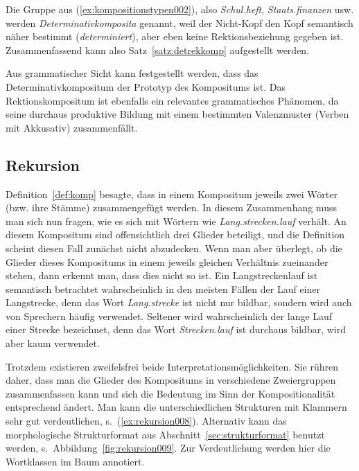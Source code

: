 Die Gruppe aus (\ref{ex:kompositionstypen002}), also \textit{Schul.heft}, \textit{Staats.finanzen} usw. werden \textit{Determinativkomposita} genannt, weil der Nicht-Kopf den Kopf semantisch näher bestimmt (\textit{determiniert}), aber eben keine Rektionsbeziehung gegeben ist.
Zusammenfassend kann also Satz~\ref{satz:detrekkomp} aufgestellt werden.


Aus grammatischer Sicht kann festgestellt werden, dass das Determinativkompositum der Prototyp des Kompositums ist.
Das Rektionskompositum ist ebenfalls ein relevantes grammatisches Phänomen, da seine durchaus produktive Bildung mit einem bestimmten Valenzmuster (Verben mit Akkusativ) zusammenfällt.

\subsection{Rekursion}
\label{sec:rekursion}


Definition~\ref{def:komp} besagte, dass in einem Kompositum jeweils zwei Wörter (bzw. ihre Stämme) zusammengefügt werden.
In diesem Zusammenhang muss man sich nun fragen, wie es sich mit Wörtern wie \textit{Lang.strecken.lauf} verhält.
An diesem Kompositum sind offensichtlich drei Glieder beteiligt, und die Definition scheint diesen Fall zunächst nicht abzudecken.
Wenn man aber überlegt, ob die Glieder dieses Kompositums in einem jeweils gleichen Verhältnis zueinander stehen, dann erkennt man, dass dies nicht so ist.
Ein Langstreckenlauf ist semantisch betrachtet wahrscheinlich in den meisten Fällen der Lauf einer Langstrecke, denn das Wort \textit{Lang.strecke} ist nicht nur bildbar, sondern wird auch von Sprechern häufig verwendet.
Seltener wird wahrscheinlich der lange Lauf einer Strecke bezeichnet, denn das Wort \textit{Strecken.lauf} ist durchaus bildbar, wird aber kaum verwendet.

Trotzdem existieren zweifelsfrei beide Interpretationsmöglichkeiten.
Sie rühren daher, dass man die Glieder des Kompositums in verschiedene Zweiergruppen zusammenfassen kann und sich die Bedeutung im Sinn der Kompositionalität entsprechend ändert.
Man kann die unterschiedlichen Strukturen mit Klammern sehr gut verdeutlichen, s.\ (\ref{ex:rekursion008}).
Alternativ kann das morphologische Strukturformat aus Abschnitt~\ref{sec:strukturformat} benutzt werden, s.\ Abbildung~\ref{fig:rekursion009}.
Zur Verdeutlichung werden hier die Wortklassen im Baum annotiert.

